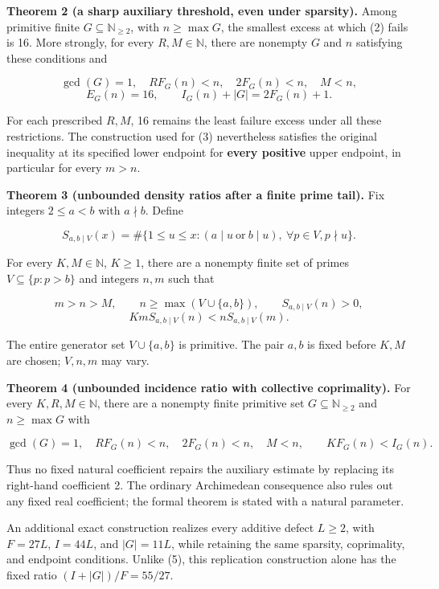 \documentclass[
  11pt,
]{article}
\begin{document}
\textbf{Theorem 2 (a sharp auxiliary threshold, even under sparsity).}
Among primitive finite \(G\subseteq\mathbb N_{\ge2}\), with
\(n\ge\max G\), the smallest excess at which (2) fails is 16. More
strongly, for every \(R,M\in\mathbb N\), there are nonempty \(G\) and
\(n\) satisfying these conditions and

\[
\gcd(G)=1,\quad RF_G(n)<n,\quad 2F_G(n)<n,\quad M<n,
\] \[
E_G(n)=16,\qquad I_G(n)+|G|=2F_G(n)+1. \tag{3}
\]

For each prescribed \(R,M\), 16 remains the least failure excess under
all these restrictions. The construction used for (3) nevertheless
satisfies the original inequality at its specified lower endpoint for
\textbf{every positive} upper endpoint, in particular for every \(m>n\).

\textbf{Theorem 3 (unbounded density ratios after a finite prime tail).}
Fix integers \(2\le a<b\) with \(a\nmid b\). Define

\[
S_{a,b\mid V}(x)=\#\{1\le u\le x:(a\mid u\ \text{or}\ b\mid u),\
\forall p\in V, p\nmid u\}.
\]

For every \(K,M\in\mathbb N\), \(K\ge1\), there are a nonempty finite
set of primes \(V\subseteq\{p:p>b\}\) and integers \(n,m\) such that

\[
m>n> M,\qquad n\ge\max(V\cup\{a,b\}),\qquad S_{a,b\mid V}(n)>0,
\] \[
K m S_{a,b\mid V}(n)<nS_{a,b\mid V}(m). \tag{4}
\]

The entire generator set \(V\cup\{a,b\}\) is primitive. The pair \(a,b\)
is fixed before \(K,M\) are chosen; \(V,n,m\) may vary.

\textbf{Theorem 4 (unbounded incidence ratio with collective
coprimality).} For every \(K,R,M\in\mathbb N\), there are a nonempty
finite primitive set \(G\subseteq\mathbb N_{\ge2}\) and \(n\ge\max G\)
with

\[
\gcd(G)=1,\quad RF_G(n)<n,\quad 2F_G(n)<n,\quad M<n,
\qquad KF_G(n)<I_G(n). \tag{5}
\]

Thus no fixed natural coefficient repairs the auxiliary estimate by
replacing its right-hand coefficient 2. The ordinary Archimedean
consequence also rules out any fixed real coefficient; the formal
theorem is stated with a natural parameter.

An additional exact construction realizes every additive defect
\(L\ge2\), with \(F=27L\), \(I=44L\), and \(|G|=11L\), while retaining
the same sparsity, coprimality, and endpoint conditions. Unlike (5),
this replication construction alone has the fixed ratio
\((I+|G|)/F=55/27\).
\end{document}
